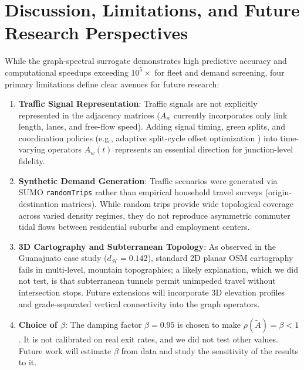 \documentclass[journal]{IEEEtran}
\begin{document}
\section{Discussion, Limitations, and Future Research Perspectives}

While the graph-spectral surrogate demonstrates high predictive accuracy and computational speedups exceeding $10^5 \times$ for fleet and demand screening, four primary limitations define clear avenues for future research:

\begin{enumerate}
    \item \textbf{Traffic Signal Representation}: Traffic signals are not explicitly represented in the adjacency matrices ($A_w$ currently incorporates only link length, lanes, and free-flow speed). Adding signal timing, green splits, and coordination policies (e.g., adaptive split-cycle offset optimization \cite{Papageorgiou2003}) into time-varying operators $A_w(t)$ represents an essential direction for junction-level fidelity.
    \item \textbf{Synthetic Demand Generation}: Traffic scenarios were generated via SUMO \texttt{randomTrips} rather than empirical household travel surveys (origin-destination matrices). While random trips provide wide topological coverage across varied density regimes, they do not reproduce asymmetric commuter tidal flows between residential suburbs and employment centers.
    \item \textbf{3D Cartography and Subterranean Topology}: As observed in the Guanajuato case study ($d_{\mathcal{H}} = 0.142$), standard 2D planar OSM cartography fails in multi-level, mountain topographies; a likely explanation, which we did not test, is that subterranean tunnels permit unimpeded travel without intersection stops. Future extensions will incorporate 3D elevation profiles and grade-separated vertical connectivity into the graph operators.
    \item \textbf{Choice of $\beta$}: The damping factor $\beta = 0.95$ is chosen to make $\rho(\tilde{A}) = \beta < 1$. It is not calibrated on real exit rates, and we did not test other values. Future work will estimate $\beta$ from data and study the sensitivity of the results to it.
\end{enumerate}
\end{document}
